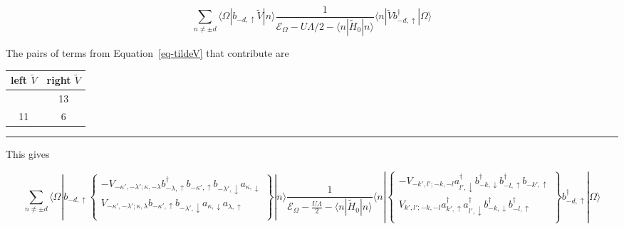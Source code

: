 \documentclass[
  letterpaper,
  DIV=11,
  numbers=noendperiod]{scrartcl}
\newcounter{none} %
\begin{document}
\begin{equation}
\sum_{n\ne \pm d}\langle\Omega|b_{-d,\uparrow}\tilde V|n\rangle\frac{1}{\mathcal{E}_\Omega-U\Lambda/2-\langle n|\tilde H_0|n\rangle}\langle n|\tilde Vb^\dagger_{-d,\uparrow}|\Omega\rangle
\end{equation}

The pairs of terms from Equation~\ref{eq-tildeV} that contribute are

{\def\LTcaptype{none} %
\begin{longtable}[]{@{}cc@{}}
\toprule\noalign{}
left \(\tilde V\) & right \(\tilde V\) \\
\midrule\noalign{}
\endhead
\bottomrule\noalign{}
\endlastfoot
14 & 13 \\
11 & 6 \\
\end{longtable}
}

\begin{center}\rule{0.5\linewidth}{0.5pt}\end{center}

This gives

\begin{equation}
\sum_{n\ne \pm d}\langle\Omega|b_{-d,\uparrow}
\left\{
\begin{matrix}
-V_{-\kappa',-\lambda';\kappa,-\lambda}b^\dagger_{-\lambda,\uparrow}b^{}_{-\kappa',\uparrow}b^{}_{-\lambda',\downarrow}a^{}_{\kappa,\downarrow}\\
V_{-\kappa',-\lambda';\kappa,\lambda}b^{}_{-\kappa',\uparrow}b^{}_{-\lambda',\downarrow}a^{}_{\kappa,\downarrow}a^{}_{\lambda,\uparrow}\\
\end{matrix}
\right\}
|n\rangle\frac{1}{\mathcal{E}_\Omega-\frac{U\Lambda}{2}-\langle n|\tilde H_0|n\rangle}\langle n|\left\{
\begin{matrix}
-V_{-k',l';-k,-l}a^\dagger_{l',\downarrow}b^\dagger_{-k,\downarrow}b^\dagger_{-l,\uparrow}b^{}_{-k',\uparrow}\\
V_{k',l';-k,-l}a^\dagger_{k',\uparrow}a^\dagger_{l',\downarrow}b^\dagger_{-k,\downarrow}b^\dagger_{-l,\uparrow}\\
\end{matrix}
\right\}
b^\dagger_{-d,\uparrow}|\Omega\rangle
\end{equation}
\end{document}

